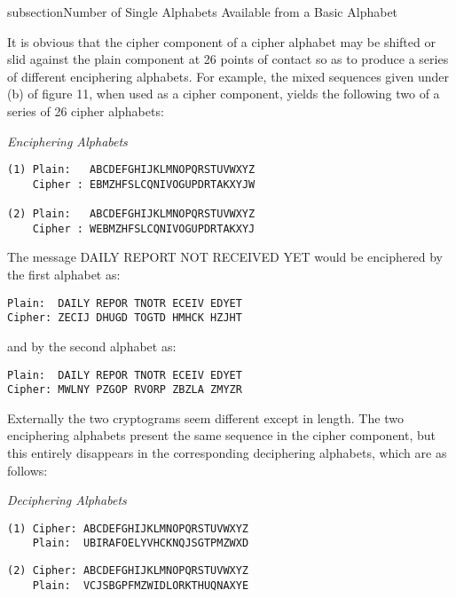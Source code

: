subsection{Number of Single Alphabets Available from a Basic Alphabet}

It is obvious that the cipher component of a cipher alphabet may be
shifted or slid against the plain component at 26 points of contact so as
to produce a series of different enciphering alphabets. For example, the
mixed sequences given under (b) of ﬁgure 11, when used as a cipher
component, yields the following two of a series of 26 cipher alphabets:

\begin{center}
\textit{Enciphering Alphabets}
\end{center}

\begin{verbatim}
(1) Plain:   ABCDEFGHIJKLMNOPQRSTUVWXYZ
    Cipher : EBMZHFSLCQNIVOGUPDRTAKXYJW

(2) Plain:   ABCDEFGHIJKLMNOPQRSTUVWXYZ
    Cipher : WEBMZHFSLCQNIVOGUPDRTAKXYJ
\end{verbatim}

The message DAILY REPORT NOT RECEIVED YET would be
enciphered by the ﬁrst alphabet as:

\begin{verbatim}
Plain:  DAILY REPOR TNOTR ECEIV EDYET
Cipher: ZECIJ DHUGD TOGTD HMHCK HZJHT
\end{verbatim}

and by the second alphabet as:
\begin{verbatim}
Plain:  DAILY REPOR TNOTR ECEIV EDYET
Cipher: MWLNY PZGOP RVORP ZBZLA ZMYZR
\end{verbatim}

Externally the two cryptograms seem different except in length. The two
enciphering alphabets present the same sequence in the cipher component, but this entirely disappears in the corresponding deciphering
alphabets, which are as follows:

\begin{center}
\textit{Deciphering Alphabets}
\end{center}

\begin{verbatim}
(1) Cipher: ABCDEFGHIJKLMNOPQRSTUVWXYZ
    Plain:  UBIRAFOELYVHCKNQJSGTPMZWXD
\end{verbatim}
\begin{verbatim}
(2) Cipher: ABCDEFGHIJKLMNOPQRSTUVWXYZ
    Plain:  VCJSBGPFMZWIDLORKTHUQNAXYE
\end{verbatim}

